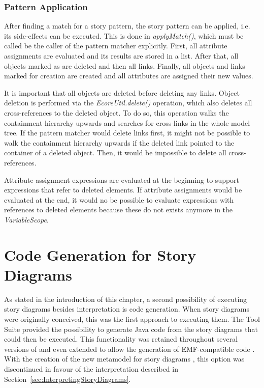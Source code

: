 \subsubsection{Pattern Application}
\label{sec:spm_pattern_application}

After finding a match for a story pattern, the story pattern can be applied, i.e. its side-effects can be executed.
This is done in \emph{applyMatch()}, which must be called be the caller of the pattern matcher explicitly.
First, all attribute assignments are evaluated and its results are stored in a list.
After that, all objects marked as \destroy are deleted and then all links.
Finally, all objects and links marked for creation are created and all attributes are assigned their new values.

It is important that all objects are deleted before deleting any links.
Object deletion is performed via the \emph{EcoreUtil.delete()} operation, which also deletes all cross-references to the deleted object.
To do so, this operation walks the containment hierarchy upwards and searches for cross-links in the whole model tree.
If the pattern matcher would delete links first, it might not be possible to walk the containment hierarchy upwards if the deleted link pointed to the container of a deleted object.
Then, it would be impossible to delete all cross-references.

Attribute assignment expressions are evaluated at the beginning to support expressions that refer to deleted elements. 
If attribute assignments would be evaluated at the end, it would no be possible to evaluate expressions with references to deleted elements because these do not exists anymore in the \emph{VariableScope}.


\section{Code Generation for Story Diagrams}
As stated in the introduction of this chapter, a second possibility of executing story diagrams besides interpretation is code generation.
When story diagrams were originally conceived, this was the first approach to executing them.
The \fuj Tool Suite \cite{KNNZ99,NNZ00} provided the possibility to generate Java code from the story diagrams that could then be executed.
This functionality was retained throughout several versions of \fuj and even extended to allow the generation of EMF-compatible code \cite{GBD07}.
With the creation of the new metamodel for story diagrams \cite{HRvD+11}, this option was discontinued in favour of the interpretation described in Section~\ref{sec:InterpretingStoryDiagrams}.